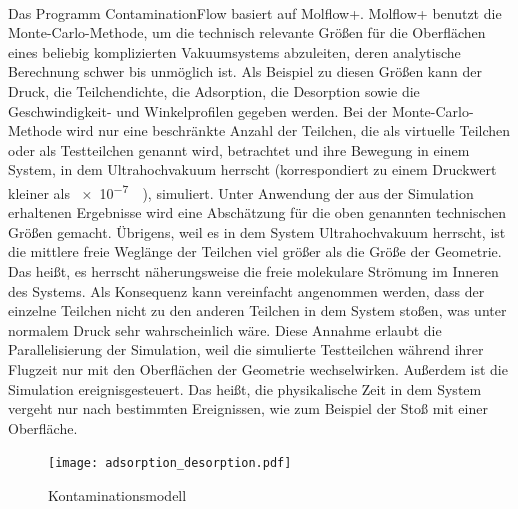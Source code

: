 \documentclass{listhesis}
\begin{document}
\paragraph{}
Das Programm ContaminationFlow basiert auf Molflow+. Molflow+ benutzt die Monte-Carlo-Methode, um die technisch relevante Größen für die Oberflächen eines beliebig komplizierten Vakuumsystems abzuleiten, deren analytische Berechnung schwer bis unmöglich ist. Als Beispiel zu diesen Größen kann der Druck, die Teilchendichte, die Adsorption, die Desorption sowie die Geschwindigkeit- und Winkelprofilen gegeben werden. Bei der Monte-Carlo-Methode wird nur eine beschränkte Anzahl der Teilchen, die als virtuelle Teilchen oder als Testteilchen genannt wird, betrachtet und ihre Bewegung in einem System, in dem Ultrahochvakuum herrscht (korrespondiert zu einem Druckwert kleiner als \SI{e-7}{\milli\Bar}), simuliert. Unter Anwendung der aus der Simulation erhaltenen Ergebnisse wird eine Abschätzung für die oben genannten technischen Größen gemacht. Übrigens, weil es in dem System Ultrahochvakuum herrscht, ist die mittlere freie Weglänge der Teilchen viel größer als die Größe der Geometrie. Das heißt, es herrscht näherungsweise die freie molekulare Strömung im Inneren des Systems. Als Konsequenz kann vereinfacht angenommen werden, dass der einzelne Teilchen nicht zu den anderen Teilchen in dem System stoßen, was unter normalem Druck sehr wahrscheinlich wäre. Diese Annahme erlaubt die Parallelisierung der Simulation, weil die simulierte Testteilchen während ihrer Flugzeit nur mit den Oberflächen der Geometrie wechselwirken. Außerdem ist die Simulation ereignisgesteuert. Das heißt, die physikalische Zeit in dem System vergeht nur nach bestimmten Ereignissen, wie zum Beispiel der Stoß mit einer Oberfläche. 

\begin{figure}[]
\centering
\texttt{[image: adsorption\_desorption.pdf]}
\caption{Kontaminationsmodell}
\label{fig:model}
\end{figure}
\end{document}
